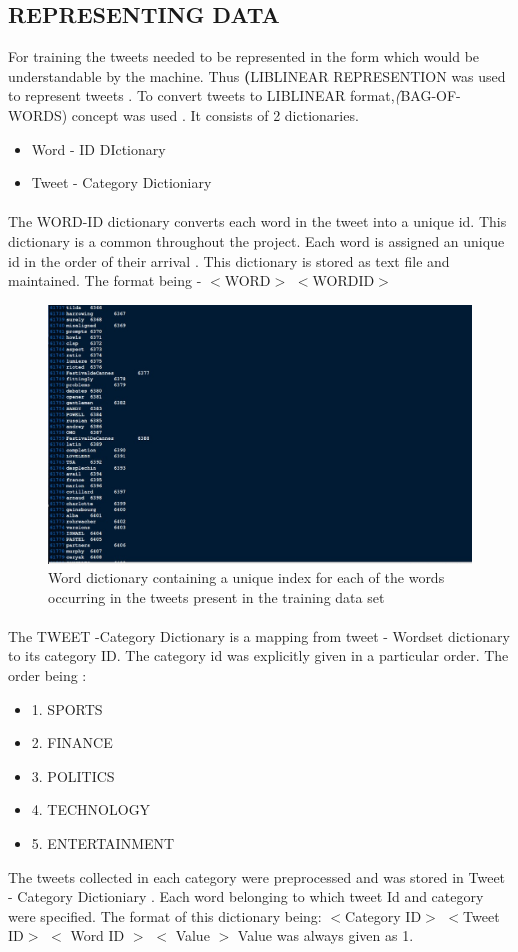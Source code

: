 \subsection{REPRESENTING DATA}
For training the tweets needed to be represented in the form which would be understandable by the machine. Thus \textbf(LIBLINEAR REPRESENTION was used to represent tweets . To convert tweets to  LIBLINEAR format,\textit(BAG-OF-WORDS) concept was used . It consists of 2 dictionaries.
\begin{itemize}
	\item Word - ID DIctionary
	\item Tweet - Category Dictioniary

\end{itemize}
\paragraph{}
The WORD-ID  dictionary converts each word in the tweet into a unique id. This dictionary is a  common throughout the project. Each word is assigned an unique id in the order of their arrival .  This dictionary is stored as text file and maintained.
The format being - $<$WORD$>$ $<$WORDID$>$
\begin{figure}[h]
	\centering
	\includegraphics[width=0.9\linewidth]{word.jpg}
	\caption{Word dictionary containing a unique index for each of the words occurring in the tweets present in the training data set}
	\label{fig:expression01}
\end{figure}
\paragraph{}The TWEET -Category Dictionary is a mapping from tweet - Wordset dictionary to its category ID. The category id was explicitly given in a particular order. The order being :
\begin{itemize}
	\item 1.  SPORTS
	\item 2.  FINANCE
	\item 3.  POLITICS
	\item 4.  TECHNOLOGY
	\item 5.  ENTERTAINMENT
\end{itemize}
The tweets collected in each category were preprocessed and was stored in Tweet - Category Dictioniary . Each word belonging to which tweet Id and category were specified. The format of this dictionary being:
$<$Category ID$>$ $<$Tweet ID$>$ $<$ Word ID $>$ $<$ Value $>$
Value was always given as 1.

